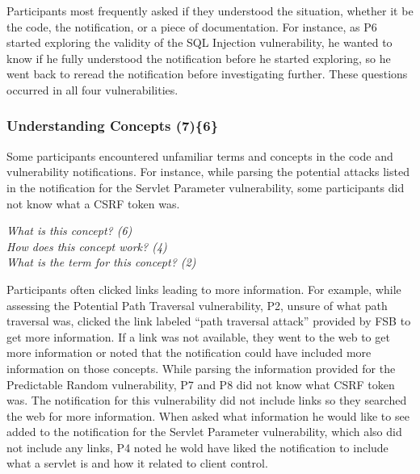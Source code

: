 \documentclass{acm_proc_article-sp}
\begin{document}
Participants most frequently asked if they understood the situation, whether it be the code, the notification, or a piece of documentation. 
For instance, as P6 started exploring the validity of the SQL Injection vulnerability, he wanted to know if he fully understood the notification before he started exploring, so he went back to reread the notification before investigating further.
These questions occurred in all four vulnerabilities.



\subsubsection{\textbf{Understanding Concepts (7)\{6\}}}\label{uc}

Some participants encountered unfamiliar terms and concepts in the code and vulnerability notifications.
For instance, while parsing the potential attacks listed in the notification for the Servlet Parameter vulnerability, some participants did not know what a CSRF token was.


\noindent\emph{What is this concept? (6)} \\
\emph{How does this concept work? (4)} \\
\emph{What is the term for this concept? (2)}



Participants often clicked links leading to more information.
For example, while assessing the Potential Path Traversal vulnerability, P2, unsure of what path traversal was, clicked the link labeled ``path traversal attack'' provided by FSB to get more information.
If a link was not available, they went to the web to get more information or noted that the notification could have included more information on those concepts.
While parsing the information provided for the Predictable Random vulnerability, P7 and P8 did not know what CSRF token was.
The notification for this vulnerability did not include links so they searched the web for more information. 
When asked what information he would like to see added to the notification for the Servlet Parameter vulnerability, which also did not include any links, P4 noted he wold have liked the notification to include what a servlet is and how it related to client control.
\end{document}
